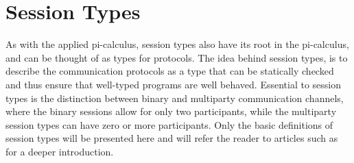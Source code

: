 \section{Session Types}
As with the applied pi-calculus, session types also have its root in the pi-calculus, and can be thought of as types for protocols. The idea behind session types, is to describe the communication protocols as a type that can be statically checked and thus ensure that well-typed programs are well behaved. Essential to session types is the distinction between binary and multiparty communication channels, where the binary sessions allow for only two participants, while the multiparty session types can have zero or more participants. Only the basic definitions of session types will be presented here and will refer the reader to articles such as \citeauthor{DBLP:journals/csur/HuttelLVCCDMPRT16} \autocite{DBLP:journals/csur/HuttelLVCCDMPRT16} for a deeper introduction. 

